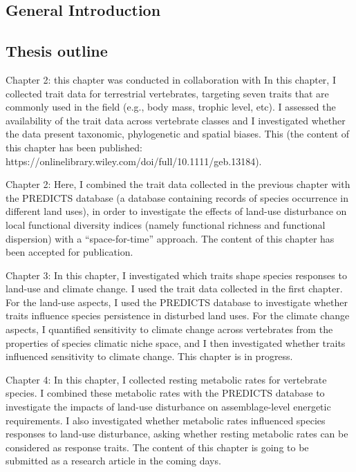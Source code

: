 \documentclass[11pt]{report}
\begin{document}
\begin{refsection}

\clearpage
\chapter{General Introduction}
%


\section*{Thesis outline}

Chapter 2: this chapter was conducted in collaboration with 
In this chapter, I collected trait data for terrestrial vertebrates, targeting seven traits that are commonly used in the field (e.g., body mass, trophic level, etc). I assessed the availability of the trait data across vertebrate classes and I investigated whether the data present taxonomic, phylogenetic and spatial biases. This  (the content of this chapter has been published: https://onlinelibrary.wiley.com/doi/full/10.1111/geb.13184).

Chapter 2: Here, I combined the trait data collected in the previous chapter with the PREDICTS database (a database containing records of species occurrence in different land uses), in order to investigate the effects of land-use disturbance on local functional diversity indices (namely functional richness and functional dispersion) with a “space-for-time” approach. The content of this chapter has been accepted for publication. 

Chapter 3: In this chapter, I investigated which traits shape species responses to land-use and climate change. I used the trait data collected in the first chapter. For the land-use aspects, I used the PREDICTS database to investigate whether traits influence species persistence in disturbed land uses. For the climate change aspects, I quantified sensitivity to climate change across vertebrates from the properties of species climatic niche space, and I then investigated whether traits influenced sensitivity to climate change. This chapter is in progress.

Chapter 4: In this chapter, I collected resting metabolic rates for vertebrate species. I combined these metabolic rates with the PREDICTS database to investigate the impacts of land-use disturbance on assemblage-level energetic requirements. I also investigated whether metabolic rates influenced species responses to land-use disturbance, asking whether resting metabolic rates can be considered as response traits. The content of this chapter is going to be submitted as a research article in the coming days. 



\end{refsection}
\end{document}
